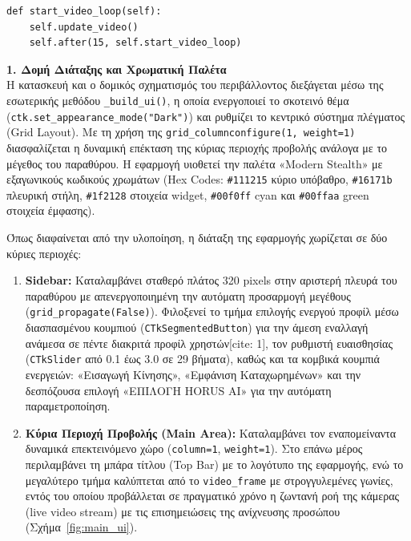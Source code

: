 \documentclass[twoside, a4paper, 11pt]{article}
\newcommand{\textlatin}[1]{\textenglish{#1}}
\begin{document}
\begin{verbatim}
def start_video_loop(self):
    self.update_video()
    self.after(15, self.start_video_loop)
\end{verbatim}

\textbf{1. Δομή Διάταξης και Χρωματική Παλέτα}\\
Η κατασκευή και ο δομικός σχηματισμός του περιβάλλοντος διεξάγεται μέσω της εσωτερικής μεθόδου \texttt{\_build\_ui()}, η οποία ενεργοποιεί το σκοτεινό θέμα (\texttt{ctk.set\_appearance\_mode("Dark")}) και ρυθμίζει το κεντρικό σύστημα πλέγματος (\textlatin{Grid Layout}). Με τη χρήση της \texttt{grid\_columnconfigure(1, weight=1)} διασφαλίζεται η δυναμική επέκταση της κύριας περιοχής προβολής ανάλογα με το μέγεθος του παραθύρου. Η εφαρμογή υιοθετεί την παλέτα «\textlatin{Modern Stealth}» με εξαγωνικούς κωδικούς χρωμάτων (\textlatin{Hex Codes}: \texttt{\#111215} κύριο υπόβαθρο, \texttt{\#16171b} πλευρική στήλη, \texttt{\#1f2128} στοιχεία widget, \texttt{\#00f0ff} \textlatin{cyan} και \texttt{\#00ffaa} \textlatin{green} στοιχεία έμφασης).

Όπως διαφαίνεται από την υλοποίηση, η διάταξη της εφαρμογής χωρίζεται σε δύο κύριες περιοχές:
\begin{enumerate}
    \item \textbf{ \textlatin{Sidebar}:} Καταλαμβάνει σταθερό πλάτος 320 \textlatin{pixels} στην αριστερή πλευρά του παραθύρου με απενεργοποιημένη την αυτόματη προσαρμογή μεγέθους (\texttt{grid\_propagate(False)}). Φιλοξενεί το τμήμα επιλογής ενεργού προφίλ μέσω διασπασμένου κουμπιού (\texttt{CTkSegmentedButton}) για την άμεση εναλλαγή ανάμεσα σε πέντε διακριτά προφίλ χρηστών[cite: 1], τον ρυθμιστή ευαισθησίας (\texttt{CTkSlider} από 0.1 έως 3.0 σε 29 βήματα), καθώς και τα κομβικά κουμπιά ενεργειών: «Εισαγωγή Κίνησης», «Εμφάνιση Καταχωρημένων» και την δεσπόζουσα επιλογή «ΕΠΙΛΟΓΗ HORUS AI» για την αυτόματη παραμετροποίηση.
    \item \textbf{Κύρια Περιοχή Προβολής (\textlatin{Main Area}):} Καταλαμβάνει τον εναπομείναντα δυναμικά επεκτεινόμενο χώρο (\texttt{column=1}, \texttt{weight=1}). Στο επάνω μέρος περιλαμβάνει τη μπάρα τίτλου (\textlatin{Top Bar}) με το λογότυπο της εφαρμογής, ενώ το μεγαλύτερο τμήμα καλύπτεται από το \texttt{video\_frame} με στρογγυλεμένες γωνίες, εντός του οποίου προβάλλεται σε πραγματικό χρόνο η ζωντανή ροή της κάμερας (\textlatin{live video stream}) με τις επισημειώσεις της ανίχνευσης προσώπου (Σχήμα~\ref{fig:main_ui}).
\end{enumerate}
\end{document}
